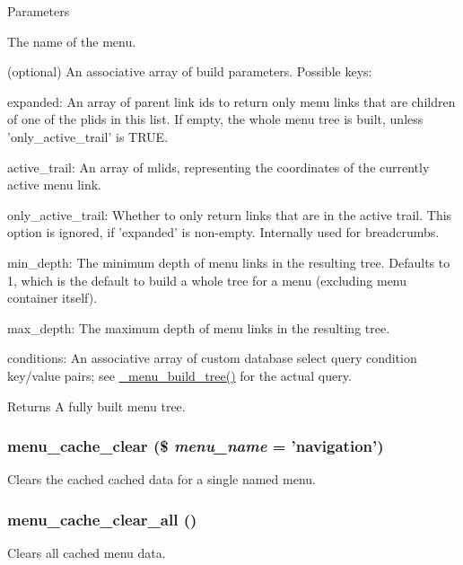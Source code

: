 \begin{DoxyParams}{Parameters}
\item[{\em \$menu\_\-name}]The name of the menu. \item[{\em \$parameters}](optional) An associative array of build parameters. Possible keys:
\begin{DoxyItemize}
\item expanded: An array of parent link ids to return only menu links that are children of one of the plids in this list. If empty, the whole menu tree is built, unless 'only\_\-active\_\-trail' is TRUE.
\item active\_\-trail: An array of mlids, representing the coordinates of the currently active menu link.
\item only\_\-active\_\-trail: Whether to only return links that are in the active trail. This option is ignored, if 'expanded' is non-\/empty. Internally used for breadcrumbs.
\item min\_\-depth: The minimum depth of menu links in the resulting tree. Defaults to 1, which is the default to build a whole tree for a menu (excluding menu container itself).
\item max\_\-depth: The maximum depth of menu links in the resulting tree.
\item conditions: An associative array of custom database select query condition key/value pairs; see \hyperlink{group__menu_ga036009a003a68a01a420737d9c1b30c0}{\_\-menu\_\-build\_\-tree()} for the actual query.
\end{DoxyItemize}\end{DoxyParams}
\begin{DoxyReturn}{Returns}
A fully built menu tree. 
\end{DoxyReturn}
\hypertarget{group__menu_ga032d6b78c7deab10685ebfa6f32ad7eb}{
\subsubsection[{menu\_\-cache\_\-clear}]{\setlength{\rightskip}{0pt plus 5cm}menu\_\-cache\_\-clear (\$ {\em menu\_\-name} = {\ttfamily 'navigation'})}}
\label{group__menu_ga032d6b78c7deab10685ebfa6f32ad7eb}
Clears the cached cached data for a single named menu. \hypertarget{group__menu_ga0a10fa44ca152a12091747e515b6a655}{
\subsubsection[{menu\_\-cache\_\-clear\_\-all}]{\setlength{\rightskip}{0pt plus 5cm}menu\_\-cache\_\-clear\_\-all ()}}
\label{group__menu_ga0a10fa44ca152a12091747e515b6a655}
Clears all cached menu data.

